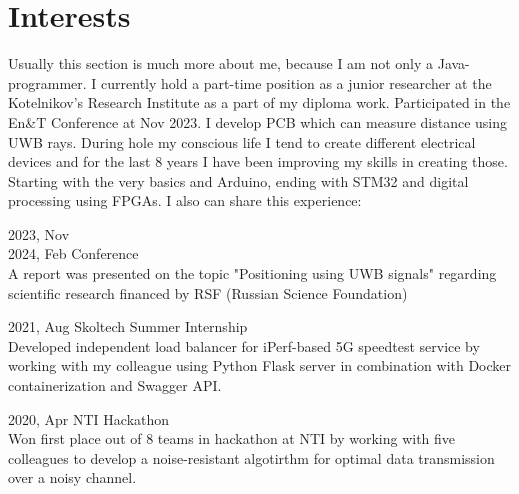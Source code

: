 \documentclass[]{cv-style}          %
\begin{document}
\section{Interests}
{\vspace{0.05cm}}
Usually this section is much more about me, because I am not only a Java-programmer. 
I currently hold a part-time position as a junior researcher at the Kotelnikov's Research Institute as a part of my diploma work. Participated in the En&T Conference at Nov 2023. I develop PCB which can measure distance using UWB rays. During hole my conscious life I tend to create different electrical devices and for the last 8 years I have been improving my skills in creating those. Starting with the very basics and Arduino, ending with STM32 and digital processing using FPGAs.
I also can share this experience:

\begin{entrylist}

\entrySkoltech
{2023, Nov\\2024, Feb}
{ Conference}
{
\\
A report was presented on the topic "Positioning using UWB signals" regarding scientific research financed by RSF (Russian Science Foundation) 
}


\entrySkoltech
{2021, Aug}
{Skoltech Summer Internship}
{
\\
Developed independent load balancer for iPerf-based 5G speedtest service by working with my colleague using Python Flask server in combination with Docker containerization and Swagger API.
}



\entry
    {2020, Apr}
    {NTI Hackathon}
    {}
    {\\
Won first place out of 8 teams in hackathon at NTI by working with five colleagues to develop a noise-resistant algotirthm for optimal data transmission over a noisy channel.
    }
    
    

\end{entrylist}


\end{document}
